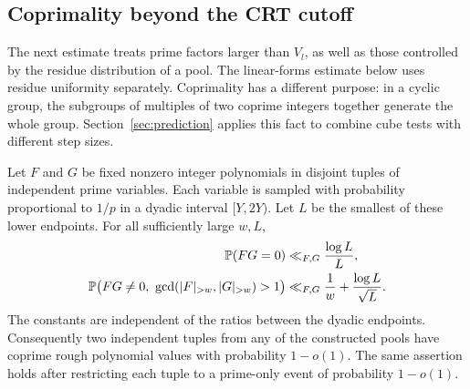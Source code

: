 \subsection{Coprimality beyond the CRT cutoff}

The next estimate treats prime factors larger than \(V_l\), as well
as those controlled by the residue distribution of a pool.  The
linear-forms estimate below uses residue uniformity separately.
Coprimality has a different purpose: in a cyclic group, the subgroups
of multiples of two coprime integers together generate the whole group.
Section~\ref{sec:prediction} applies this fact to combine cube tests
with different step sizes.

\begin{lemma}\label{lem:rough-coprimality}
Let \(F\) and \(G\) be fixed nonzero integer polynomials in disjoint
tuples of independent prime variables.  Each variable is sampled with
probability proportional to \(1/p\) in a dyadic interval \([Y,2Y)\).
Let \(L\) be the smallest of these lower endpoints.  For all
sufficiently large \(w,L\),
\begin{align}
 \mathbb P(FG=0)&\ll_{F,G}\frac{\log L}{L},\label{eq:polynomial-zero-bound}\\
 \mathbb P\bigl(FG\ne0,\ \gcd(|F|_{>w},|G|_{>w})>1\bigr)
 &\ll_{F,G}\frac1w+\frac{\log L}{\sqrt L}.
 \label{eq:rough-coprimality-bound}
\end{align}
The constants are independent of the ratios between the dyadic
endpoints.  Consequently two independent tuples from any of the
constructed pools have coprime rough polynomial values with
probability \(1-o(1)\).  The same assertion holds after restricting
each tuple to a prime-only event of probability \(1-o(1)\).
\end{lemma}

